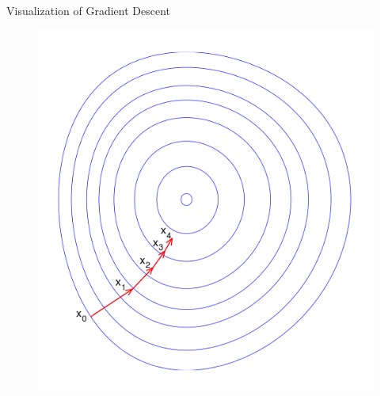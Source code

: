 \documentclass{beamer}
\begin{document}
\begin{frame}{Visualization of Gradient Descent}

\begin{figure}[h]
\includegraphics[scale=0.4]{img/nice_space}
\end{figure}

\end{frame}
\end{document}
